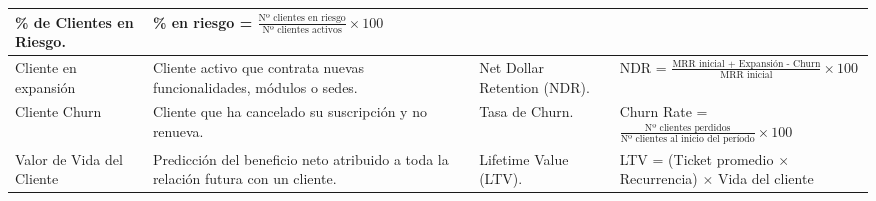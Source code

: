 \begin{appendixd}
\begin{table}[H]
\begin{threeparttable}
\begin{tabular}{|l|C{3.5cm}|C{3.3cm}|C{5.5cm}|}
      \% de Clientes en Riesgo. &
      \% en riesgo = $\tfrac{\text{Nº clientes en riesgo}}{\text{Nº clientes activos}} \times 100$ \\
      \hline
      Cliente en expansión & Cliente activo que contrata nuevas funcionalidades, módulos o sedes. &
      Net Dollar Retention (NDR). &
      NDR = $\tfrac{\text{MRR inicial + Expansión - Churn}}{\text{MRR inicial}} \times 100$ \\
      \hline
      Cliente Churn & Cliente que ha cancelado su suscripción y no renueva. &
      Tasa de Churn. &
      Churn Rate = $\tfrac{\text{Nº clientes perdidos}}{\text{Nº clientes al inicio del período}} \times 100$ \\
      \hline
      Valor de Vida del Cliente & Predicción del beneficio neto atribuido a toda la relación futura con un cliente. &
      Lifetime Value (LTV). &
      LTV = (Ticket promedio $\times$ Recurrencia) $\times$ Vida del cliente \\
      \hline
    \end{tabular}
    \label{tab:estados-cliente}
  \end{threeparttable}
\end{table}

\end{appendixd}




